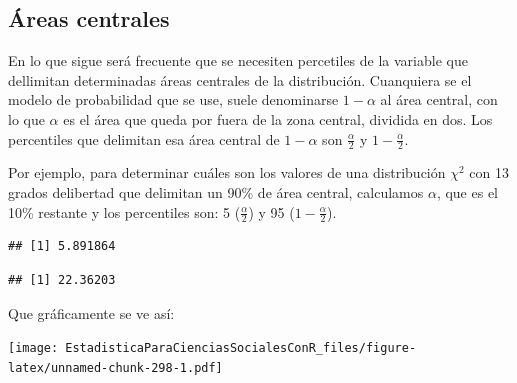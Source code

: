 \documentclass[]{book}
\begin{document}
\hypertarget{uxe1reas-centrales}{%
\subsection{Áreas centrales}\label{uxe1reas-centrales}}

En lo que sigue será frecuente que se necesiten percetiles de la variable que dellimitan determinadas áreas centrales de la distribución. Cuanquiera se el modelo de probabilidad que se use, suele denominarse \(1-\alpha\) al área central, con lo que \(\alpha\) es el área que queda por fuera de la zona central, dividida en dos. Los percentiles que delimitan esa área central de \(1-\alpha\) son \(\frac{\alpha}{2}\) y \(1-\frac{\alpha}{2}\).

Por ejemplo, para determinar cuáles son los valores de una distribución \(\chi^2\) con 13 grados delibertad que delimitan un 90\% de área central, calculamos \(\alpha\), que es el 10\% restante y los percentiles son: 5 (\(\frac{\alpha}{2}\)) y 95 (\(1-\frac{\alpha}{2}\)).

\begin{verbatim}
## [1] 5.891864
\end{verbatim}

\begin{verbatim}
## [1] 22.36203
\end{verbatim}

Que gráficamente se ve así:

\texttt{[image: EstadisticaParaCienciasSocialesConR\_files/figure-latex/unnamed-chunk-298-1.pdf]}


\end{document}
